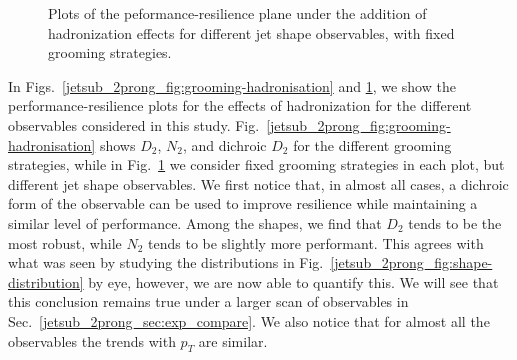\documentclass[11pt]{cernrep}
\begin{document}
\begin{figure}
  \caption{Plots of the peformance-resilience plane under the addition of hadronization effects for different jet shape observables, with fixed grooming strategies.}\label{jetsub_2prong_fig:shapes-hadronisation}
\end{figure}


In Figs.~\ref{jetsub_2prong_fig:grooming-hadronisation} and \ref{jetsub_2prong_fig:shapes-hadronisation}, we show the performance-resilience plots for the effects of hadronization for the different observables considered in this study.
%
Fig.~\ref{jetsub_2prong_fig:grooming-hadronisation} shows $D_2$, $N_2$, and dichroic $D_2$ for the different grooming strategies, while in Fig.~\ref{jetsub_2prong_fig:shapes-hadronisation} we consider fixed grooming strategies in each plot, but different jet shape observables.
%
We first notice that, in almost all cases, a dichroic form of the observable can be used to improve resilience while maintaining a similar level of performance.
%
Among the shapes, we find that $D_2$ tends to be the most robust, while $N_2$ tends to be slightly more performant.
%
This agrees with what was seen by studying the distributions in Fig.~\ref{jetsub_2prong_fig:shape-distribution} by eye, however, we are now able to quantify this.
%
We will see that this conclusion remains true under a larger scan of observables in Sec.~\ref{jetsub_2prong_sec:exp_compare}.
%
We also notice that for almost all the observables the trends with $p_T$ are similar.
\end{document}
